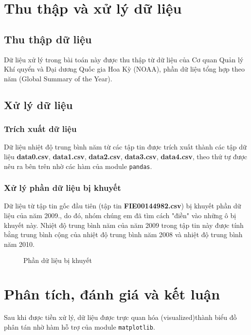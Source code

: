 \documentclass[a4paper]{article}
\begin{document}
\section{Thu thập và xử lý dữ liệu}
\subsection{Thu thập dữ liệu}
Dữ liệu xử lý trong bài toán này được thu thập từ dữ liệu của Cơ quan Quản lý Khí quyển và Đại dương Quốc gia Hoa Kỳ (NOAA), phần dữ liệu tổng hợp theo năm (Global Summary of the Year).

\subsection{Xử lý dữ liệu}
\subsubsection{Trích xuất dữ liệu}
Dữ liệu nhiệt độ trung bình năm từ các tập tin được trích xuất thành các tập dữ liệu \textbf{data0.csv}, \textbf{data1.csv}, \textbf{data2.csv}, \textbf{data3.csv}, \textbf{data4.csv}, theo thứ tự được nêu ra bên trên nhờ các hàm của module \lstinline{pandas}.
\subsubsection{Xử lý phần dữ liệu bị khuyết}
Dữ liệu từ tập tin gốc đầu tiên (tập tin \textbf{FIE00144982.csv}) bị khuyết phần dữ liệu của năm 2009., do đó, nhóm chúng em đã tìm cách "điền" vào những ô bị khuyết này. Nhiệt độ trung bình năm của năm 2009 trong tập tin này được tính bằng trung bình cộng của nhiệt độ trung bình năm 2008 và nhiệt độ trung bình năm 2010.\\
\begin{figure}[H]
\caption{Phần dữ liệu bị khuyết}
\end{figure}

\section{Phân tích, đánh giá và kết luận}
Sau khi được tiền xử lý, dữ liệu được trực quan hóa (visualized)thành biểu đồ phân tán nhờ hàm hỗ trợ của module \lstinline{matplotlib}.
\end{document}
